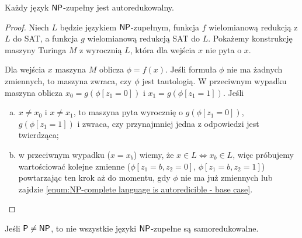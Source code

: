 \begin{theorem}
    Każdy język $\textsf{NP}$-zupełny jest autoredukowalny.
\end{theorem}
\begin{proof}
    Niech $L$ będzie językiem $\textsf{NP}$-zupełnym, funkcja $f$ wielomianową redukcją z $L$ do SAT, a funkcja $g$ wielomianową redukcją SAT do $L$. Pokażemy konstrukcję maszyny Turinga $M$ z wyrocznią $L$, która dla wejścia $x$ nie pyta o $x$.

    Dla wejścia $x$ maszyna $M$ oblicza $\phi = f(x)$. Jeśli formuła $\phi$ nie ma żadnych zmiennych, to maszyna zwraca, czy $\phi$ jest tautologią. W przeciwnym wypadku maszyna oblicza $x_0 = g(\phi[z_1 = 0])$ i $x_1 = g(\phi[z_1 = 1])$. Jeśli
    \begin{enumerate}[(a)]
        \item $x \neq x_0$ i $x \neq x_1$, to maszyna pyta wyrocznię o $g(\phi[z_1 = 0])$, $g(\phi[z_1 = 1])$ i zwraca, czy przynajmniej jedna z odpowiedzi jest twierdząca;\label{enum:NP-complete language is autoredicible - base case}
        \item w przeciwnym wypadku ($x = x_b$) wiemy, że $x \in L \iff x_b \in L$, więc próbujemy wartościować kolejne zmienne ($\phi[z_1 = b, z_2 = 0]$, $\phi[z_1 = b, z_2 = 1]$) powtarzając ten krok aż do momentu, gdy $\phi$ nie ma już zmiennych lub zajdzie \ref{enum:NP-complete language is autoredicible - base case}.
    \end{enumerate}
\end{proof}

\begin{theorem}
    Jeśli $\textsf{P} \neq \textsf{NP}$, to nie wszystkie języki $\textsf{NP}$-zupełne są samoredukowalne.
\end{theorem}